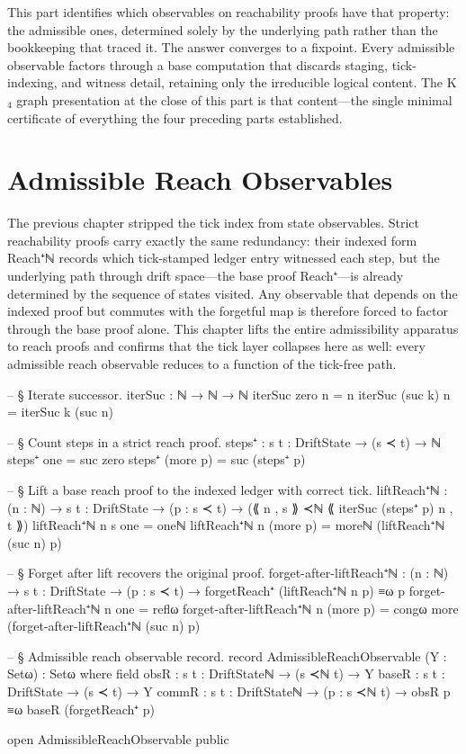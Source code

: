 \documentclass[11pt,a4paper]{book}
\def\texttt#1{#1}%
\begin{document}
This part identifies which observables on reachability proofs have that property: the admissible ones, determined solely by the underlying path rather than the bookkeeping that traced it. The answer converges to a fixpoint. Every admissible observable factors through a base computation that discards staging, tick-indexing, and witness detail, retaining only the irreducible logical content. The K$_4$ graph presentation at the close of this part is that content---the single minimal certificate of everything the four preceding parts established.

\chapter{Admissible Reach Observables}

The previous chapter stripped the tick index from state observables. Strict reachability proofs carry exactly the same redundancy: their indexed form \texttt{Reach⁺ℕ} records which tick-stamped ledger entry witnessed each step, but the underlying path through drift space---the base proof \texttt{Reach⁺}---is already determined by the sequence of states visited. Any observable that depends on the indexed proof but commutes with the forgetful map is therefore forced to factor through the base proof alone. This chapter lifts the entire admissibility apparatus to reach proofs and confirms that the tick layer collapses here as well: every admissible reach observable reduces to a function of the tick-free path.

\begin{code}
-- § Iterate successor.
iterSuc : ℕ → ℕ → ℕ
iterSuc zero    n = n
iterSuc (suc k) n = iterSuc k (suc n)

-- § Count steps in a strict reach proof.
steps⁺ : {s t : DriftState} → (s ≺ t) → ℕ
steps⁺ one      = suc zero
steps⁺ (more p) = suc (steps⁺ p)

-- § Lift a base reach proof to the indexed ledger with correct tick.
liftReach⁺ℕ :
  (n : ℕ) → {s t : DriftState} →
  (p : s ≺ t) →
  (⟪ n , s ⟫ ≺ℕ ⟪ iterSuc (steps⁺ p) n , t ⟫)
liftReach⁺ℕ n {s} one = oneℕ
liftReach⁺ℕ n (more p) = moreℕ (liftReach⁺ℕ (suc n) p)

-- § Forget after lift recovers the original proof.
forget-after-liftReach⁺ℕ :
  (n : ℕ) → {s t : DriftState} →
  (p : s ≺ t) →
  forgetReach⁺ (liftReach⁺ℕ n p) ≡ω p
forget-after-liftReach⁺ℕ n one = reflω
forget-after-liftReach⁺ℕ n (more p) = congω more (forget-after-liftReach⁺ℕ (suc n) p)

-- § Admissible reach observable record.
record AdmissibleReachObservable (Y : Setω) : Setω where
  field
    obsR  : {s t : DriftStateℕ} → (s ≺ℕ t) → Y
    baseR : {s t : DriftState} → (s ≺ t) → Y
    commR : {s t : DriftStateℕ} → (p : s ≺ℕ t) → obsR p ≡ω baseR (forgetReach⁺ p)

open AdmissibleReachObservable public
\end{code}
\end{document}
